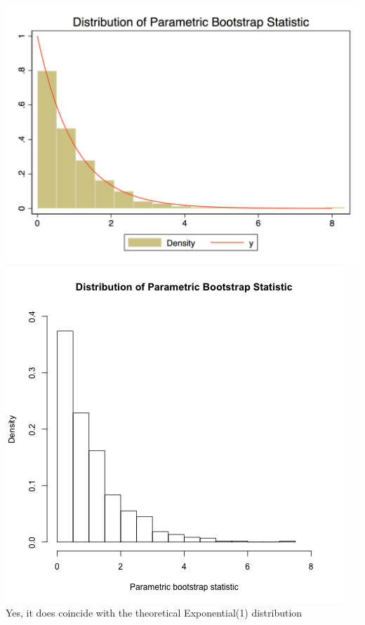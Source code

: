 \documentclass[12pt]{article}
\begin{document}
\subsection{}
\includegraphics[totalheight=6cm]{hw3_Q3_2_stata.png}
\includegraphics[totalheight=6cm]{hw3_q3_3_r.png}\\

Yes, it does coincide with the theoretical Exponential(1) distribution
\subsection{}
\end{document}
